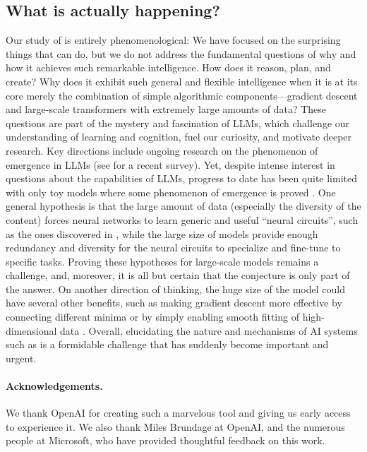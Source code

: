 \subsection{What is actually happening?} \label{sec:whatsgoingon}
Our study of {\DV} is entirely phenomenological: We have focused on the surprising things that {\DV} can do, but we do not address the fundamental questions of why and how it achieves such remarkable intelligence. How does it reason, plan, and create? Why does it exhibit such general and flexible intelligence when it is at its core merely the combination of simple algorithmic components---gradient descent and large-scale transformers with extremely large amounts of data? These questions are part of the mystery and fascination of LLMs, which challenge our understanding of learning and cognition, fuel our curiosity, and motivate deeper research. Key directions include ongoing research on the phenomenon of emergence in LLMs (see \cite{wei2022emergent} for a recent survey). Yet, despite intense interest in questions about the capabilities of LLMs, progress to date has been quite limited with only toy models where some phenomenon of emergence is proved \cite{barak2022hidden, ahn2022learning,jelassi2022vision}. One general hypothesis \cite{olah2020zoom} is that the large amount of data (especially the  diversity of the content) forces neural networks to learn generic and useful ``neural circuits'', such as the ones discovered in \cite{olsson2022context, zhang2022unveiling, liu2022transformers}, while the large size of models provide enough redundancy and diversity for the neural circuits to specialize and fine-tune to specific tasks. 
Proving these hypotheses for large-scale models remains a challenge, and, moreover, it is all but certain that the conjecture is only part of the answer. On another direction of thinking, the huge size of the model could have several other benefits, such as making gradient descent more effective by connecting different minima \cite{venturi2019spurious} or by simply enabling smooth fitting of high-dimensional data \cite{pmlr-v49-eldan16, NEURIPS2021_f197002b}. Overall, elucidating the nature and mechanisms of AI systems such as {\DV} is a formidable challenge that has suddenly become important and urgent.
\newline

\paragraph{Acknowledgements.} We thank OpenAI for creating such a marvelous tool and giving us early access to experience it. We also thank Miles Brundage at OpenAI, and the numerous people at Microsoft, who have provided thoughtful feedback on this work.